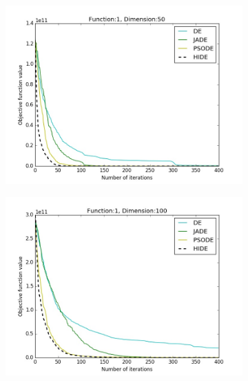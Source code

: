 \documentclass[a4paper,twoside]{article}
\begin{document}
\begin{figure}[h!]
\begin{subfigure}[b]{0.24\textwidth}
        \caption{}
    \end{subfigure}    
    \begin{subfigure}[b]{0.24\textwidth}
        \includegraphics[width=\textwidth,natwidth=800,natheight=600]{plot_50D_F1_save}
        \caption{}
    \end{subfigure}
    \begin{subfigure}[b]{0.24\textwidth}
        \includegraphics[width=\textwidth,natwidth=800,natheight=600]{plot_100D_F1_save}
        \caption{}
    \end{subfigure}


\end{figure}
\end{document}

